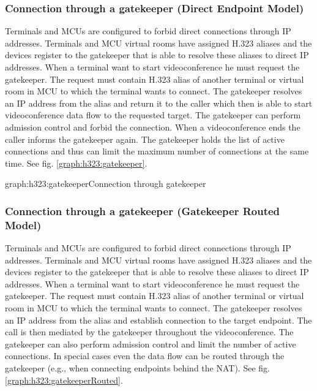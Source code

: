 \subsubsection{Connection through a gatekeeper (Direct Endpoint Model)}

Terminals and MCUs are configured to forbid direct connections through IP 
addresses. Terminals and MCU virtual rooms have assigned H.323 aliases and the 
devices register to the gatekeeper that is able to resolve these aliases to 
direct IP addresses. When a terminal want to start videoconference he must 
request the gatekeeper. The request must contain H.323 alias of another 
terminal or virtual room in MCU to which the terminal wants to connect. The 
gatekeeper resolves an IP address from the alias and return it to the caller 
which then is able to start videoconference data flow to the requested target. 
The gatekeeper can perform admission control and forbid the connection. When a 
videoconference ends the caller informs the gatekeeper again. The gatekeeper 
holds the list of active connections and thus can limit the maximum number of 
connections at the same time. See fig. \ref{graph:h323:gatekeeper}.

\begin{Graph}{graph:h323:gatekeeper}{Connection through gatekeeper}
  
  
\end{Graph}

\subsubsection{Connection through a gatekeeper (Gatekeeper Routed Model)}

Terminals and MCUs are configured to forbid direct connections through IP 
addresses. Terminals and MCU virtual rooms have assigned H.323 aliases and the 
devices register to the gatekeeper that is able to resolve these aliases to 
direct IP addresses. When a terminal want to start videoconference he must 
request the gatekeeper. The request must contain H.323 alias of another 
terminal or virtual room in MCU to which the terminal wants to connect. The 
gatekeeper resolves an IP address from the alias and establish connection to 
the target endpoint. The call is then mediated by the gatekeeper throughout 
the videoconference. The gatekeeper can also perform admission control and 
limit the number of active connections. In special cases even the data flow 
can be routed through the gatekeeper (e.g., when connecting endpoints behind 
the NAT). See fig. \ref{graph:h323:gatekeeperRouted}.

